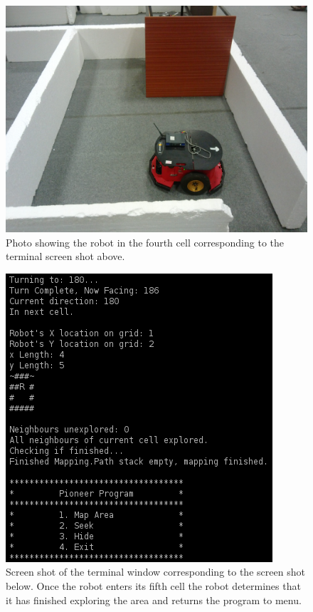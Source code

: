 \documentclass[a4paper,12pt]{article}
\begin{document}
\begin{figure}[H]
\includegraphics[scale=0.13]{RealS4.jpg}
\caption{Photo showing the robot in the fourth cell corresponding to the terminal screen shot above.}
\end{figure}

\begin{figure}[H]
\includegraphics[scale=1.0]{RealRunT5.png}
\caption{Screen shot of the terminal window corresponding to the screen shot below. Once the robot enters its fifth cell the robot determines that it has finished exploring the area and returns the program to menu.}
\end{figure}
\end{document}
